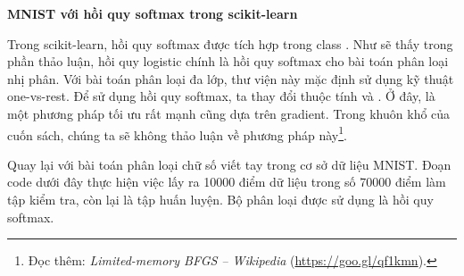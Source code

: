 

\newpage
\textbf{MNIST với hồi quy softmax trong scikit-learn}

Trong scikit-learn, hồi quy softmax được tích hợp trong class
. Như sẽ thấy trong phần
thảo luận, hồi quy logistic chính là hồi quy softmax cho bài toán phân loại nhị
phân. Với bài toán phân loại đa lớp, thư viện này mặc định sử dụng kỹ thuật
one-vs-rest. Để sử dụng hồi quy softmax, ta thay đổi thuộc tính
 và .
Ở đây,  là một phương pháp tối ưu rất mạnh cũng dựa trên
gradient. Trong khuôn khổ của cuốn sách, chúng ta sẽ không thảo luận về phương
pháp này\footnote{Đọc thêm: \textit{Limited-memory BFGS -- Wikipedia} (\url{https://goo.gl/qf1kmn}).}.

Quay lại với bài toán phân loại chữ số viết tay trong cơ sở dữ liệu MNIST. Đoạn
code dưới đây thực hiện việc lấy ra 10000 điểm dữ liệu trong số 70000 điểm làm
tập kiểm tra, còn lại là tập huấn luyện. Bộ phân loại được sử dụng là hồi quy softmax.




